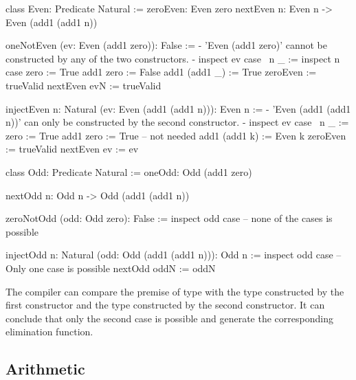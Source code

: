 \begin{alba}
    class
        Even: Predicate Natural
    :=
        zeroEven: Even zero
        nextEven {n}: Even n -> Even (add1 (add1 n))



    oneNotEven (ev: Even (add1 zero)): False :=
        {- 'Even (add1 zero)' cannot be constructed by any of the
           two constructors. -}
        inspect ev case
            {\ {n} _ :=
                inspect n case
                    zero :=
                        True
                    add1 zero :=
                        False
                    add1 (add1 _) :=
                        True}
            zeroEven :=
                trueValid
            nextEven evN :=
                trueValid


    injectEven {n: Natural} (ev: Even (add1 (add1 n))): Even n :=
        {- 'Even (add1 (add1 n))' can only be constructed by the
           second constructor. -}
        inspect ev case
            {\ {n} _ :=
                zero :=
                    True
                add1 zero :=
                    True   -- not needed
                add1 (add1 k) :=
                    Even k}
            zeroEven :=
                trueValid
            nextEven ev :=
                ev
\end{alba}



\begin{alba}
    class
        Odd: Predicate Natural
    :=
        oneOdd: Odd (add1 zero)

        nextOdd {n}: Odd n -> Odd (add1 (add1 n))


    zeroNotOdd (odd: Odd zero): False :=
        inspect odd case
            -- none of the cases is possible

    injectOdd {n: Natural} (odd: Odd (add1 (add1 n))): Odd n :=
        inspect odd case
            -- Only one case is possible
            nextOdd oddN := oddN
\end{alba}

The compiler can compare the premise of type  with
the type  constructed by the first constructor and the
type  constructed by the second constructor. It can
conclude that only the second case is possible and generate the corresponding
elimination function.




\vskip 5mm
\subsection{Arithmetic}

